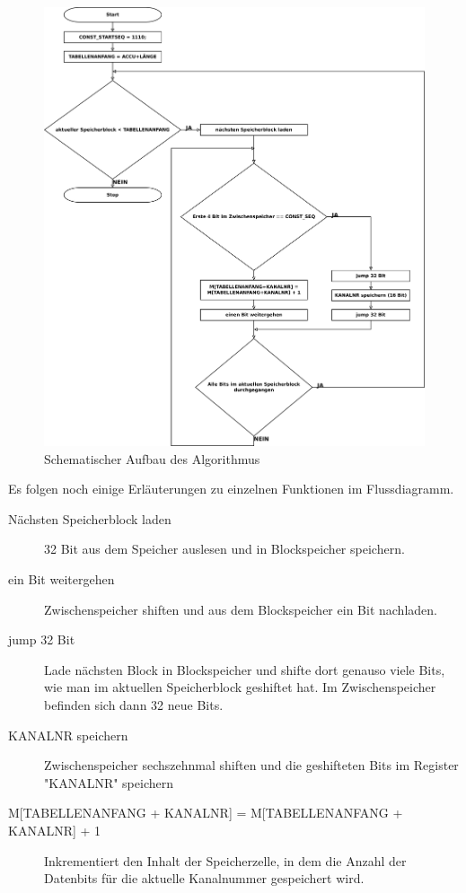 \begin{figure}[htb]
    \centering
    \includegraphics[width=\textwidth]{pflichtenheft/res/algorithmus.pdf}
    \caption{Schematischer Aufbau des Algorithmus}
    \label{figure:Pflichtenheft-SystemtechnischeLoesung-Loesungsansatz-Algorithmus}
\end{figure}

\clearpage

Es folgen noch einige Erläuterungen zu einzelnen Funktionen im Flussdiagramm.

\begin{description}
    \item[{Nächsten Speicherblock laden}] 32 Bit aus dem Speicher auslesen und in Blockspeicher speichern.
    
    \item[{ein Bit weitergehen}] Zwischenspeicher shiften und aus dem Blockspeicher ein Bit nachladen.
    
    \item[{jump 32 Bit}] Lade nächsten Block in Blockspeicher und shifte dort genauso viele Bits, wie man im aktuellen Speicherblock geshiftet hat. Im Zwischenspeicher befinden sich dann 32 neue Bits.
    
    \item[{KANALNR speichern}] Zwischenspeicher sechszehnmal shiften und die geshifteten Bits im Register "KANALNR" speichern
    
    \item[{M[TABELLENANFANG + KANALNR] = M[TABELLENANFANG + KANALNR] + 1}] Inkrementiert den Inhalt der Speicherzelle, in dem die Anzahl der Datenbits für die aktuelle Kanalnummer gespeichert wird.
\end{description}


